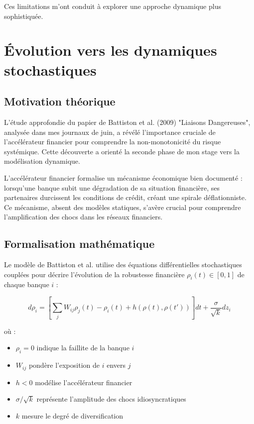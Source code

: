 \documentclass[12pt,a4paper,twoside]{article}
\begin{document}
Ces limitations m'ont conduit à explorer une approche dynamique plus sophistiquée.

\section{Évolution vers les dynamiques stochastiques}

\subsection{Motivation théorique}

L'étude approfondie du papier de Battiston et al. (2009) "Liaisons Dangereuses", analysée dans mes journaux de juin, a révélé l'importance cruciale de l'accélérateur financier pour comprendre la non-monotonicité du risque systémique. Cette découverte a orienté la seconde phase de mon stage vers la modélisation dynamique.

L'accélérateur financier formalise un mécanisme économique bien documenté : lorsqu'une banque subit une dégradation de sa situation financière, ses partenaires durcissent les conditions de crédit, créant une spirale déflationniste. Ce mécanisme, absent des modèles statiques, s'avère crucial pour comprendre l'amplification des chocs dans les réseaux financiers.

\subsection{Formalisation mathématique}

Le modèle de Battiston et al. utilise des équations différentielles stochastiques couplées pour décrire l'évolution de la robustesse financière $\rho_i(t) \in [0,1]$ de chaque banque $i$ :

$$d\rho_i = \left[\sum_j W_{ij}\rho_j(t) - \rho_i(t) + h(\rho(t),\rho(t'))\right]dt + \frac{\sigma}{\sqrt{k}}dz_i$$

où :
\begin{itemize}
\item $\rho_i = 0$ indique la faillite de la banque $i$
\item $W_{ij}$ pondère l'exposition de $i$ envers $j$
\item $h < 0$ modélise l'accélérateur financier
\item $\sigma/\sqrt{k}$ représente l'amplitude des chocs idiosyncratiques
\item $k$ mesure le degré de diversification
\end{itemize}
\end{document}
